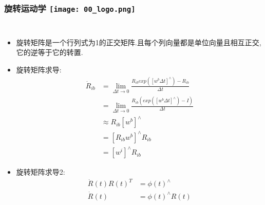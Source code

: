 
\begin{frame}
  \frametitle{旋转运动学 \hfill \texttt{[image: 00\_logo.png]}}
  \begin{columns}
    
    \begin{itemize}
      \item 旋转矩阵是一个行列式为1的正交矩阵.且每个列向量都是单位向量且相互正交,它的逆等于它的转置.

      \item 旋转矩阵求导:
      \begin{equation}
        \begin{split}
          \dot{R}_{ib} &= \lim_{\Delta t \to 0} \frac{R_{ib} exp([w^b\Delta t]^\land) - R_{ib}}{\Delta t} \\
          &= \lim_{\Delta t \to 0} \frac{R_{ib} (exp([w^b\Delta t]^\land) - I)}{\Delta t} \\
          &\approx R_{ib} [w^b]^\land  \\
          & = [R_{ib}w^b]^\land R_{ib} \\
          & = [w^i]^\land R_{ib}
        \end{split}
      \end{equation} 

      \item 旋转矩阵求导2:
      \begin{equation}
        \begin{split}
          \dot{R}(t)R(t)^T &= \phi(t)^\land \\
          \dot{R}(t) &= \phi(t)^\land R(t) \\
        \end{split}
      \end{equation} 

    \end{itemize}


    
  
  \end{columns}
  \end{frame}   



